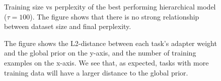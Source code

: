 \documentclass[fullpaper]{nldl}
\begin{document}
\begin{figure}
    \centering
    \caption{Training size vs perplexity of the best performing hierarchical model ($\tau = 100$). The figure shows that there is no strong relationship between dataset size and final perplexity.}
    \label{fig:absolute_improvement}
\end{figure}


\begin{figure}[ht]
    \centering
    \caption{The figure shows the L2-distance between each task's adapter weight and the global prior on the y-axis, and the number of training examples on the x-axis. We see that, as expected, tasks with more training data will have a larger distance to the global prior.}
    \label{fig:weights_vs_datalen} 
\end{figure}
\end{document}
